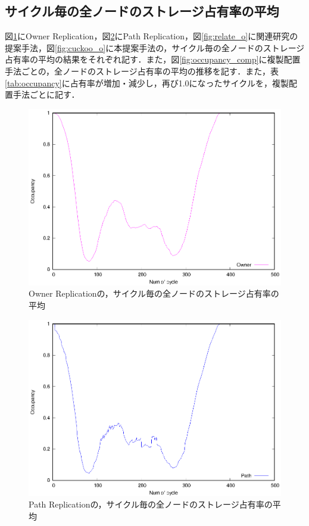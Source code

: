 \documentclass[11pt]{jreport}
\begin{document}
\subsection{サイクル毎の全ノードのストレージ占有率の平均}
図\ref{fig:owner_o}にOwner Replication，図\ref{fig:path_o}にPath Replication，図\ref{fig:relate_o}に関連研究の提案手法，図\ref{fig:cuckoo_o}に本提案手法の，サイクル毎の全ノードのストレージ占有率の平均の結果をそれぞれ記す．また，図\ref{fig:occupancy_comp}に複製配置手法ごとの，全ノードのストレージ占有率の平均の推移を記す．また，表\ref{tab:occupancy}に占有率が増加・減少し，再び1.0になったサイクルを，複製配置手法ごとに記す．

\begin{figure}[H]
	\begin{center}
		\includegraphics[width=15.0cm]{./figure/owner_occupancy.eps}
	\end{center}
	\caption{Owner Replicationの，サイクル毎の全ノードのストレージ占有率の平均}
	\label{fig:owner_o}
\end{figure}

\begin{figure}[H]
	\begin{center}
		\includegraphics[width=15.0cm]{./figure/path_occupancy.eps}
	\end{center}
	\caption{Path Replicationの，サイクル毎の全ノードのストレージ占有率の平均}
	\label{fig:path_o}
\end{figure}
\end{document}

